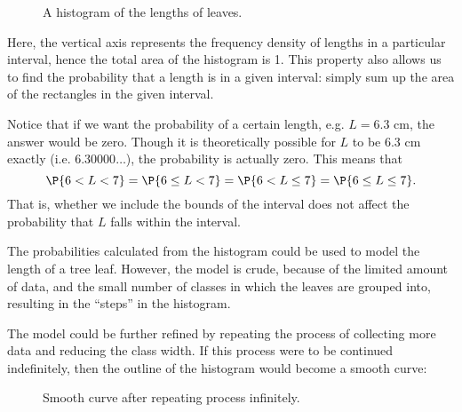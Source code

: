 \begin{figure}[H]
    \centering
    \caption{A histogram of the lengths of leaves.}
\end{figure}

Here, the vertical axis represents the frequency density of lengths in a particular interval, hence the total area of the histogram is 1. This property also allows us to find the probability that a length is in a given interval: simply sum up the area of the rectangles in the given interval. 

Notice that if we want the probability of a certain length, e.g. $L = 6.3$ cm, the answer would be zero. Though it is theoretically possible for $L$ to be $6.3$ cm exactly (i.e. $6.30000\dots$), the probability is actually zero. This means that \[\P{6 < L < 7} = \P{6 \leq L < 7} = \P{6 < L \leq 7} = \P{6 \leq L \leq 7}.\] That is, whether we include the bounds of the interval does not affect the probability that $L$ falls within the interval.

The probabilities calculated from the histogram could be used to model the length of a tree leaf. However, the model is crude, because of the limited amount of data, and the small number of classes in which the leaves are grouped into, resulting in the ``steps'' in the histogram.

The model could be further refined by repeating the process of collecting more data and reducing the class width. If this process were to be continued indefinitely, then the outline of the histogram would become a smooth curve:

\begin{figure}[H]
    \centering
    \caption{Smooth curve after repeating process infinitely.}
\end{figure}

